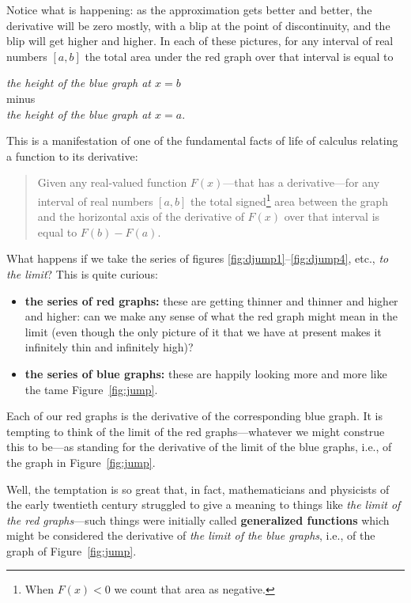 \documentclass[openany]{book}
\theoremstyle{plain}
\theoremstyle{definition}
\begin{document}
{Notice what is happening: as the approximation gets better and
better, the derivative will be zero mostly, with a blip at the point
of discontinuity, and the blip will get higher and higher.
In each of these pictures,  for any interval of real numbers $[a,b]$ the total area under the red graph over that interval is equal to
\begin{center}
{\it the height of the blue graph at $x=b$}\\
minus\\
{\it  the height of the blue graph  at $x=a$}.
\end{center}
This is a manifestation of one of the fundamental facts of life of
calculus relating a function to its derivative:

\begin{quote} Given any real-valued function $F(x)$---that has a
  derivative---for any interval of real numbers $[a,b]$ the total
  signed\footnote{When $F(x)<0$ we count that area as negative.} area
  between the graph and the horizontal axis
  of the derivative of $F(x)$ over that interval is
  equal to $F(b)-F(a)$.
  \end{quote}
    What happens if we take the series of figures \ref{fig:djump1}--\ref{fig:djump4}, etc.,
    {\it to the limit}?  This is quite curious:

  \begin{itemize}
  \item {\bf the series of red graphs:} these are getting thinner and
    thinner and higher and higher: can we make any sense of what the
    red graph might mean in the limit (even though the only picture of
    it that we have at present makes it infinitely thin and infinitely
    high)?

  \item {\bf the series of blue graphs:} these are happily looking
    more and more like the tame Figure~\ref{fig:jump}.
   \end{itemize}

   Each of our red graphs is the derivative of the corresponding blue
   graph. It is tempting to think of the limit of the red
   graphs---whatever we might construe this to be---as standing for
   the derivative of the limit of the blue graphs, i.e., of the graph
   in Figure~\ref{fig:jump}.

   Well, the temptation is so great that, in fact, mathematicians and
   physicists of the early twentieth century struggled to give a
   meaning to things like {\it the limit of the red graphs}---such
   things were initially called {\bf generalized functions} which
   might be considered the derivative of {\it the limit of the blue
     graphs}, i.e., of the graph of Figure~\ref{fig:jump}.


}
\end{document}

